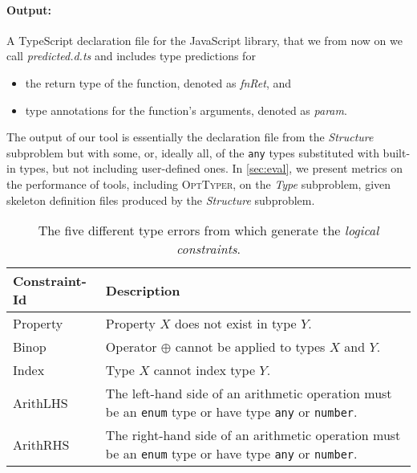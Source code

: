 \documentclass[sigplan,10pt,review,anonymous]{acmart} %
\newcommand{\projectname}{\textsc{OptTyper}\xspace}
\theoremstyle{plain}
\theoremstyle{remark}
\theoremstyle{definition}
\begin{document}
\paragraph{Output:} A TypeScript declaration file for the
JavaScript library, that we from now on we call \textit{predicted.d.ts} and
includes type predictions for
\begin{itemize}[label=\raisebox{0.25ex}{\tiny$\bullet$}]
	\item the return type of the function, denoted as \emph{fnRet}, and
	\item type annotations for the function's arguments, denoted as \emph{param}.
\end{itemize}
%
The output of our tool is essentially the declaration file from the \textit{Structure} subproblem
but with some, or, ideally all, of the \texttt{any} types substituted with built-in types, but not including user-defined ones.
%
In \cref{sec:eval}, we present metrics on the performance of tools, including \projectname, on the \textit{Type} subproblem,
given skeleton definition files produced by the \textit{Structure} subproblem. 

\begin{table*}[t]
	\centering
	\caption{The five different type errors from which generate the \textit{logical constraints}.}
	\label{tab:constraints}
	\begin{tabularx}{\textwidth}{lX}
		\toprule
		Constraint-Id & Description                                                                                  \\
		\midrule
		Property      & Property $X$ does not exist in type $Y$.                                                     \\
		Binop         & Operator $\oplus$ cannot be applied
		to types $X$ and $Y$.                                                                                        \\
		Index         & Type $X$ cannot index type $Y$.                                                              \\
		ArithLHS      & The left-hand side of an arithmetic operation must be
		an \lstinline+enum+ type or have type \lstinline+any+ or \lstinline+number+.    \\
		ArithRHS      & The right-hand side of an arithmetic operation must be
		an \lstinline+enum+ type or have type \lstinline+any+ or \lstinline+number+. \\
		\bottomrule
	\end{tabularx}
\end{table*}
\end{document}
